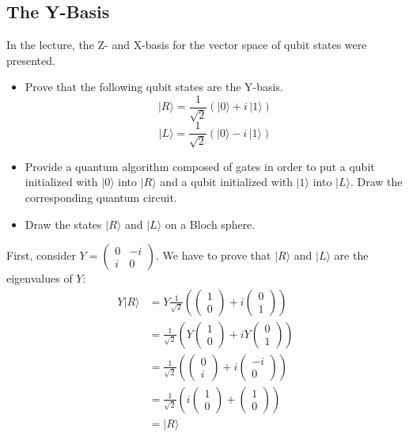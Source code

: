 \documentclass{article}
\begin{document}
  \subsection{The Y-Basis}
  \begin{centerframebox}
    In the lecture, the Z- and X-basis for the vector space of qubit states were presented.

    \begin{itemize}
      \item Prove that the following qubit states are the Y-basis.
      \[ |R\rangle = \frac{1}{\sqrt{2}} (|0\rangle+i\,|1\rangle) \]
      \[ |L\rangle = \frac{1}{\sqrt{2}} (|0\rangle-i\,|1\rangle) \]
      \item Provide a quantum algorithm composed of gates in order to put a qubit initialized with $|0\rangle$
      into $|R\rangle$ and a qubit initialized with $|1\rangle$ into $|L\rangle$. Draw the corresponding quantum circuit.
      \item Draw the states $|R\rangle$ and $|L\rangle$ on a Bloch sphere.
    \end{itemize}
  \end{centerframebox}
  First, consider $Y = \begin{pmatrix}0&-i\\i&0\end{pmatrix}$. We have to prove that $|R\rangle$ and $|L\rangle$ are the eigenvalues of $Y$:
  \begin{align*}
      Y|R\rangle &= Y\frac{1}{\sqrt{2}}\left(\begin{pmatrix}1\\0\end{pmatrix}+i\begin{pmatrix}0\\1\end{pmatrix}\right)\\
      &= \frac{1}{\sqrt{2}}\left(Y\begin{pmatrix}1\\0\end{pmatrix} + iY\begin{pmatrix}0\\1\end{pmatrix}\right)\\
      &= \frac{1}{\sqrt{2}}\left(\begin{pmatrix}0\\i\end{pmatrix} + i\begin{pmatrix}-i\\0\end{pmatrix}\right)\\
      &= \frac{1}{\sqrt{2}}\left(i\begin{pmatrix}1\\0\end{pmatrix} + \begin{pmatrix}1\\0\end{pmatrix}\right)\\
      &= |R\rangle
  \end{align*}
\end{document}
